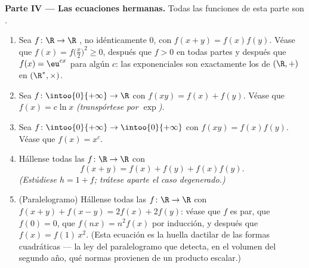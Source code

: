 \begin{problem}[{Problema del fin de semana --- $f(x + y) = f(x) + f(y)$:
la regularidad fuerza la linealidad, y el retrato de los monstruos}]
\medskip
\noindent\textbf{Parte IV --- Las ecuaciones hermanas.} Todas las
funciones de esta parte son .
\begin{enumerate}[resume]
  \item Sea $f \colon \R \to \R$ , no idénticamente $0$, con
        $f(x + y) = f(x)f(y)$. Véase que
        $f(x) = f\bigl(\frac x2\bigr)^2 \geq 0$, después que $f > 0$
        en todas partes y después que $f(x) = \eu^{cx}$ para algún
        $c$: las exponenciales son exactamente los 
         de $(\R, +)$ en $(\R^*, \times)$.
  \item Sea $f \colon \intoo{0}{+\infty} \to \R$  con
        $f(xy) = f(x) + f(y)$. Véase que $f(x) = c\ln x$
        \emph{(transpórtese por $\exp$)}.
  \item Sea $f \colon \intoo{0}{+\infty} \to \intoo{0}{+\infty}$
         con $f(xy) = f(x)f(y)$. Véase que $f(x) = x^c$.
  \item Hállense todas las $f \colon \R \to \R$  con
        \[
        f(x + y) = f(x) + f(y) + f(x)f(y) .
        \]
        \emph{(Estúdiese $h = 1 + f$; trátese aparte el caso
        degenerado.)}
  \item (Paralelogramo) Hállense todas las $f \colon \R \to \R$
         con $f(x + y) + f(x - y) = 2f(x) + 2f(y)$:
        véase que $f$ es par, que $f(0) = 0$, que
        $f(nx) = n^2 f(x)$ por inducción, y después que
        $f(x) = f(1)\,x^2$. (Esta ecuación es la huella dactilar de
        las formas cuadráticas --- la ley del paralelogramo que
        detecta, en el volumen del segundo año, qué normas provienen
        de un producto escalar.)
\end{enumerate}


\end{problem}
